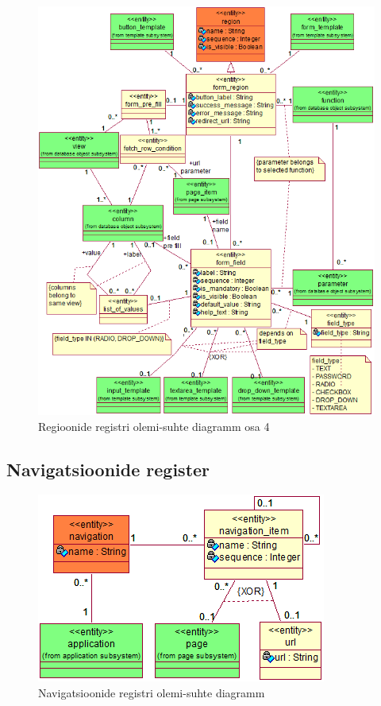 \documentclass[a4paper,12pt]{article} %
\begin{document}
\begin{figure}[H]
\begin{center}
\includegraphics[bb=0 0 640 776,scale=1]{./diagrams/form-region-er-diagram.png}
\caption{Regioonide registri olemi-suhte diagramm osa 4}
\label{fig_vormide_regioonide_registri_olemi_suhte_diagramm}
\end{center}
\end{figure}

\subsection{Navigatsioonide register}
\begin{figure}[H]
\begin{center}
\includegraphics[bb=0 0 360 235,scale=1]{./diagrams/navigation-er-diagram.png}
\caption{Navigatsioonide registri olemi-suhte diagramm}
\label{fig_navigatsioonide_registri_olemi_suhte_diagramm}
\end{center}
\end{figure}
\end{document}
